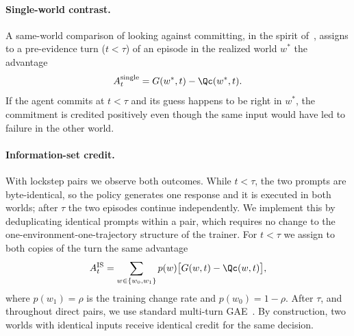 \paragraph{Single-world contrast.}
A same-world comparison of looking against committing, in the spirit of~\cite{seekvln2026}, assigns to a pre-evidence turn ($t < \tau$) of an episode in the realized world $w^\ast$ the advantage
\begin{equation}
A^{\mathrm{single}}_t = G(w^\ast, t) - \Qc(w^\ast, t).
\end{equation}
If the agent commits at $t < \tau$ and its guess happens to be right in $w^\ast$, the commitment is credited positively even though the same input would have led to failure in the other world.

\paragraph{Information-set credit.}
With lockstep pairs we observe both outcomes.
While $t < \tau$, the two prompts are byte-identical, so the policy generates one response and it is executed in both worlds; after $\tau$ the two episodes continue independently.
We implement this by deduplicating identical prompts within a pair, which requires no change to the one-environment-one-trajectory structure of the trainer.
For $t < \tau$ we assign to both copies of the turn the same advantage
\begin{equation}
A^{\mathrm{IS}}_t = \sum_{w \in \{w_0, w_1\}} p(w) \big[ G(w, t) - \Qc(w, t) \big],
\label{eq:is}
\end{equation}
where $p(w_1) = \rho$ is the training change rate and $p(w_0) = 1 - \rho$.
After $\tau$, and throughout direct pairs, we use standard multi-turn GAE~\cite{gae2016,vagen2025}.
By construction, two worlds with identical inputs receive identical credit for the same decision.

